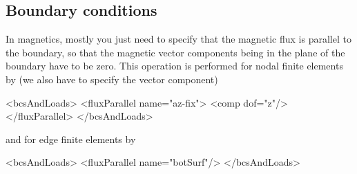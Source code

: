 \subsection{Boundary conditions}
In magnetics, mostly you just need to specify that the magnetic flux
is parallel to the boundary, so that the magnetic vector components
being in the plane of the boundary have to be zero. This operation is
performed for nodal finite elements by (we also have to specify the
vector component)
\begin{xmllisting}
<bcsAndLoads>
   <fluxParallel name="az-fix">
       <comp dof="z"/>
   </fluxParallel>          
</bcsAndLoads>
\end{xmllisting}

and for edge finite elements by
\begin{xmllisting}
<bcsAndLoads>
    <fluxParallel name="botSurf"/>
</bcsAndLoads>
\end{xmllisting}


